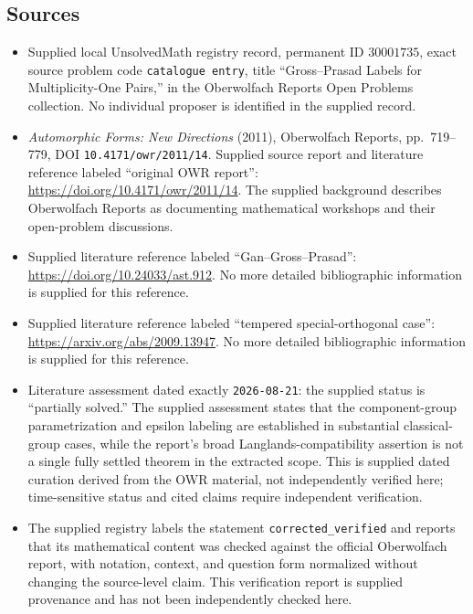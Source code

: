 \documentclass[11pt]{article}
\begin{document}
\subsection{Sources}
\begin{itemize}
\item Supplied local UnsolvedMath registry record, permanent ID \(30001735\), exact source problem code \texttt{catalogue entry}, title ``Gross--Prasad Labels for Multiplicity-One Pairs,'' in the Oberwolfach Reports Open Problems collection. No individual proposer is identified in the supplied record.
\item \emph{Automorphic Forms: New Directions} (2011), Oberwolfach Reports, pp.\ 719--779, DOI \texttt{10.4171/owr/2011/14}. Supplied source report and literature reference labeled ``original OWR report'': \url{https://doi.org/10.4171/owr/2011/14}. The supplied background describes Oberwolfach Reports as documenting mathematical workshops and their open-problem discussions.
\item Supplied literature reference labeled ``Gan--Gross--Prasad'': \url{https://doi.org/10.24033/ast.912}. No more detailed bibliographic information is supplied for this reference.
\item Supplied literature reference labeled ``tempered special-orthogonal case'': \url{https://arxiv.org/abs/2009.13947}. No more detailed bibliographic information is supplied for this reference.
\item Literature assessment dated exactly \texttt{2026-08-21}: the supplied status is ``partially solved.'' The supplied assessment states that the component-group parametrization and epsilon labeling are established in substantial classical-group cases, while the report's broad Langlands-compatibility assertion is not a single fully settled theorem in the extracted scope. This is supplied dated curation derived from the OWR material, not independently verified here; time-sensitive status and cited claims require independent verification.
\item The supplied registry labels the statement \texttt{corrected\_verified} and reports that its mathematical content was checked against the official Oberwolfach report, with notation, context, and question form normalized without changing the source-level claim. This verification report is supplied provenance and has not been independently checked here.
\end{itemize}
\end{document}
